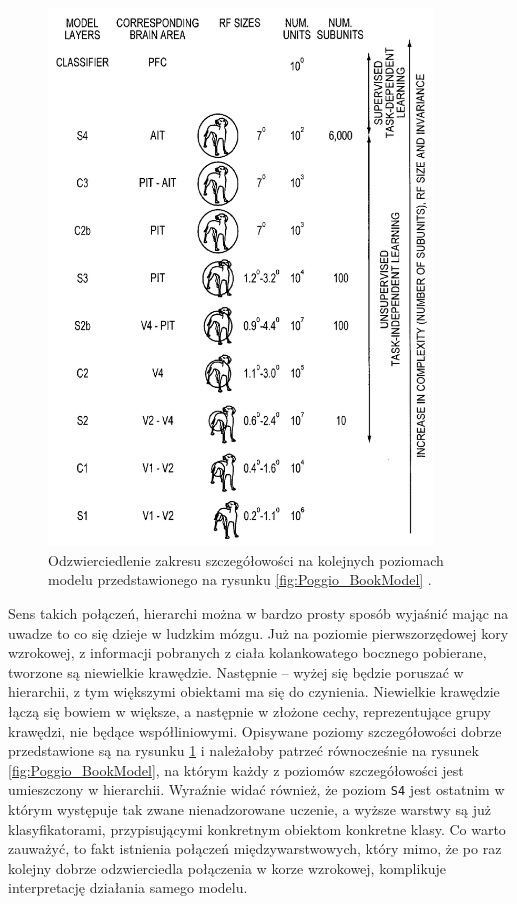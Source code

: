 \begin{figure}[ht]
	\centering
	\includegraphics[width=0.91\textwidth]{images/patent_model_scale.png}
	\caption{Odzwierciedlenie zakresu szczegółowości na kolejnych poziomach modelu przedstawionego na rysunku \ref{fig:Poggio_BookModel} \cite{USPatent}.}
	\label{fig:USPatent_fineLevel}
\end{figure}

Sens takich połączeń, hierarchi można w bardzo prosty sposób wyjaśnić mając na uwadze to co się dzieje w ludzkim mózgu. Już na poziomie pierwszorzędowej kory wzrokowej, z informacji pobranych z ciała kolankowatego bocznego pobierane, tworzone są niewielkie krawędzie. Następnie -- wyżej się będzie poruszać w hierarchii, z tym większymi obiektami ma się do czynienia. Niewielkie krawędzie łączą się bowiem w większe, a następnie w złożone cechy, reprezentujące grupy krawędzi, nie będące współliniowymi. Opisywane poziomy szczegółowości dobrze przedstawione są na rysunku \ref{fig:USPatent_fineLevel} i należałoby patrzeć równocześnie na rysunek \ref{fig:Poggio_BookModel}, na którym każdy z poziomów szczegółowości jest umieszczony w hierarchii. Wyraźnie widać również, że poziom \texttt{S4} jest ostatnim w którym występuje tak zwane nienadzorowane uczenie, a wyższe warstwy są już klasyfikatorami, przypisującymi konkretnym obiektom konkretne klasy. Co warto zauważyć, to fakt istnienia połączeń międzywarstwowych, który mimo, że po raz kolejny dobrze odzwierciedla połączenia w korze wzrokowej, komplikuje interpretację działania samego modelu.\\

